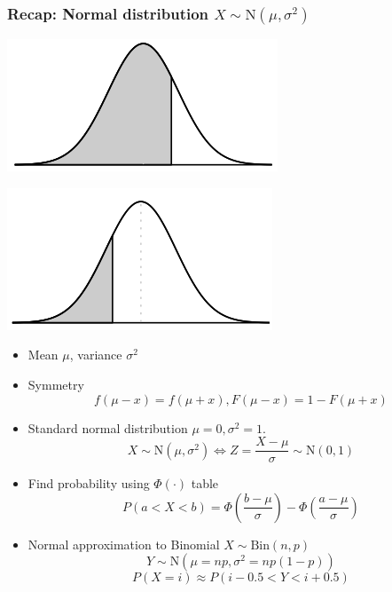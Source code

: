 \documentclass[slidestop,compress,mathserif]{beamer}
\begin{document}
\begin{frame}\frametitle{Recap: Normal distribution $X \sim \text{N}(\mu, \sigma^2)$}

{
\begin{center}
\includegraphics[scale = 0.3]{figures/cdf_pos}
\end{center}
\begin{center}
\includegraphics[scale = 0.3]{figures/cdf_neg}
\end{center}
}
{
\begin{itemize}
\item Mean $\mu$, variance $\sigma^2$
\item Symmetry \vspace{-0.2cm}
\[ f(\mu-x) = f(\mu+x), F(\mu-x) = 1 - F(\mu+x) \]
\item \pause\vspace{-0.2cm}
Standard normal distribution $\mu = 0, \sigma^2 = 1$. \vspace{-0.2cm}
\[ X \sim \text{N}(\mu, \sigma^2) \Longleftrightarrow Z = \frac{X - \mu}{\sigma} \sim \text{N}(0, 1)\]
\item \vspace{-0.2cm}
Find probability using $\Phi(\cdot)$ table \vspace{-0.2cm}
\[ P(a< X < b) = \Phi\left( \frac{b - \mu}{\sigma}\right) - \Phi\left( \frac{a - \mu}{\sigma}\right) \]
\item \pause\vspace{-0.2cm}
Normal approximation to Binomial $X \sim \text{Bin}(n, p)$ \vspace{-0.2cm}
\[ Y \sim \text{N}(\mu = np, \sigma^2 = np(1-p))\] \[P(X = i) \approx P(i - 0.5 < Y < i + 0.5) \]
\end{itemize}
}


\end{frame}
\end{document}
